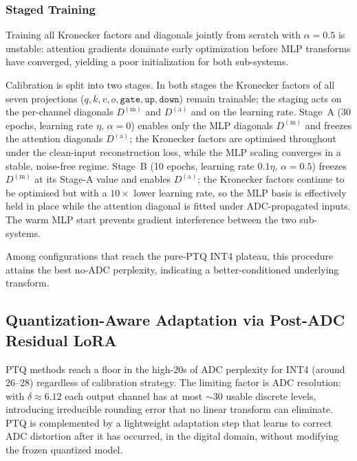 \documentclass[a4paper,11pt,oneside]{article}
\theoremstyle{breakstyle}
\begin{document}
  \subsubsection{Staged Training}\label{sec:staged}

  Training all Kronecker factors and diagonals jointly from scratch
  with $\alpha = 0.5$ is unstable: attention gradients dominate early
  optimization before MLP transforms have converged, yielding a poor
  initialization for both sub-systems.

  Calibration is split into two stages.  In both stages the
  Kronecker factors of all seven projections
  ($q, k, v, o, \texttt{gate}, \texttt{up}, \texttt{down}$) remain
  trainable; the staging acts on the per-channel diagonals
  $D^{(\mathrm{m})}$ and $D^{(\mathrm{a})}$ and on the learning
  rate.  Stage~A (30 epochs, learning rate $\eta$, $\alpha = 0$)
  enables only the MLP diagonals $D^{(\mathrm{m})}$ and freezes the
  attention diagonals $D^{(\mathrm{a})}$; the Kronecker factors are
  optimised throughout under the clean-input reconstruction loss,
  while the MLP scaling converges in a stable, noise-free regime.
  Stage~B (10 epochs, learning rate $0.1\eta$, $\alpha = 0.5$)
  freezes $D^{(\mathrm{m})}$ at its Stage-A value and enables
  $D^{(\mathrm{a})}$; the Kronecker factors continue to be
  optimised but with a $10\times$ lower learning rate, so the MLP
  basis is effectively held in place while the attention diagonal
  is fitted under ADC-propagated inputs.  The warm MLP start
  prevents gradient interference between the two sub-systems.
  
  Among configurations that reach the pure-PTQ INT4 plateau, this procedure attains the best
  no-ADC perplexity, indicating a better-conditioned underlying
  transform.

  \subsection{Quantization-Aware Adaptation via Post-ADC Residual LoRA}

  PTQ methods reach a floor in the high-20s of ADC perplexity for
  INT4 (around 26--28) regardless of calibration strategy.
  The limiting factor is ADC resolution: with $\delta \approx 6.12$
  each output channel has at most $\sim$30 usable discrete levels,
  introducing irreducible rounding error that no linear transform can
  eliminate.
  PTQ is complemented by a lightweight adaptation step that learns to
  correct ADC distortion after it has occurred, in the digital
  domain, without modifying the frozen quantized model.
\end{document}
